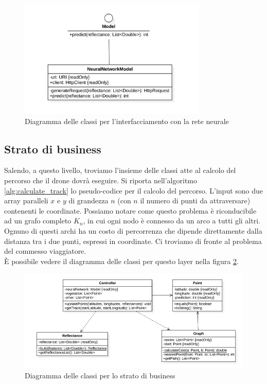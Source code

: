 \begin{figure}
    \centering
    \includegraphics[width=0.8\textwidth]{immagini/model_classes.png}
    \caption{Diagramma delle classi per l'interfacciamento con la rete neurale}
    \label{fig:class_diagram_neural_network}
\end{figure}

\subsection{Strato di business}
Salendo, a questo livello, troviamo l'insieme delle classi atte al calcolo del percorso che il drone dovrà eseguire. Si riporta nell'algoritmo \ref{alg:calculate_track} lo pseudo-codice per il calcolo del percorso. L'input sono due array paralleli $x$ e $y$ di grandezza $n$ (con $n$ il numero di punti da attraversare) contenenti le coordinate. Possiamo notare come questo problema è riconducibile ad un grafo completo $K_n$, in cui ogni nodo è connesso da un arco a tutti gli altri. Ognuno di questi archi ha un costo di percorrenza che dipende direttamente dalla distanza tra i due punti, espressi in coordinate. Ci troviamo di fronte al problema del commesso viaggiatore.\\
È possibile vedere il diagramma delle classi per questo layer nella figura \ref{fig:class_diagram_business}.

\begin{figure}
    \centering
    \includegraphics[width=\textwidth]{immagini/business_classes.png}
    \caption{Diagramma delle classi per lo strato di business}
    \label{fig:class_diagram_business}
\end{figure}

